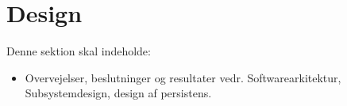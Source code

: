 \section{Design}
Denne sektion skal indeholde:

\begin{itemize}
    \item Overvejelser, beslutninger og resultater vedr. Softwarearkitektur, Subsystemdesign, design af persistens. 
\end{itemize}{}